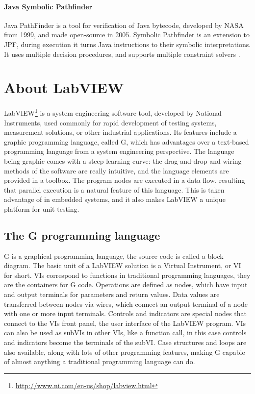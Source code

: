 \paragraph{Java Symbolic Pathfinder}
Java PathFinder is a tool for verification of Java bytecode, developed by NASA from 1999, and made open-source in 2005. Symbolic Pathfinder is an extension to JPF, during execution it turns Java instructions to their symbolic interpretations. It uses multiple decision procedures, and supports multiple constraint solvers \cite{Pasareanu2013SymbolicPI}.



\section{About LabVIEW}
LabVIEW\footnote{\url{http://www.ni.com/en-us/shop/labview.html}} is a system engineering software tool, developed by National Instruments, used commonly for rapid development of testing systems, measurement solutions, or other industrial applications. Its features include a graphic programming language, called G, which has advantages over a text-based programming language from a system engineering perspective. The language being graphic comes with a steep learning curve: the drag-and-drop and wiring methods of the software are really intuitive, and the language elements are provided in a toolbox. The program nodes are executed in a data flow, resulting that parallel execution is a natural feature of this language. This is taken advantage of in embedded systems, and it also makes LabVIEW a unique platform for unit testing.
\subsection{The G programming language}
G is a graphical programming language, the source code is called a block diagram. The basic unit of a LabVIEW solution is a Virtual Instrument, or VI for short. VIs correspond to functions in traditional programming languages, they are the containers for G code. Operations are defined as nodes, which have input and output terminals for parameters and return values. Data values are transferred between nodes via wires, which connect an output terminal of a node with one or more input terminals. Controls and indicators are special nodes that connect to the VIs front panel, the user interface of the LabVIEW program. VIs can also be used as subVIs in other VIs, like a function call, in this case controls and indicators become the terminals of the subVI. Case structures and loops are also available, along with lots of other programming features, making G capable of almost anything a traditional programming language can do.

